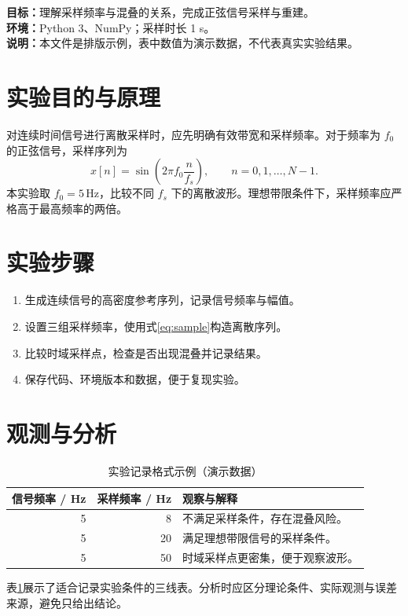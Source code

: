\documentclass[UTF8,fontset=fandol,a4paper,zihao=-4]{ctexart}
\begin{document}
\uestccover
\begin{summarybox}[实验概览]
\textbf{目标：}理解采样频率与混叠的关系，完成正弦信号采样与重建。\\
\textbf{环境：}Python 3、NumPy；采样时长 1 s。\\
\textbf{说明：}本文件是排版示例，表中数值为演示数据，不代表真实实验结果。
\end{summarybox}
\section{实验目的与原理}
对连续时间信号进行离散采样时，应先明确有效带宽和采样频率。对于频率为 $f_0$ 的正弦信号，采样序列为
\begin{equation}\label{eq:sample}
x[n]=\sin\left(2\pi f_0\frac{n}{f_s}\right),\qquad n=0,1,\ldots,N-1.
\end{equation}
本实验取 $f_0=5\,\mathrm{Hz}$，比较不同 $f_s$ 下的离散波形。理想带限条件下，采样频率应严格高于最高频率的两倍。
\section{实验步骤}
\begin{enumerate}
\item 生成连续信号的高密度参考序列，记录信号频率与幅值。
\item 设置三组采样频率，使用式\eqref{eq:sample}构造离散序列。
\item 比较时域采样点，检查是否出现混叠并记录结果。
\item 保存代码、环境版本和数据，便于复现实验。
\end{enumerate}
\section{观测与分析}
\begin{table}[htbp]\centering
\caption{实验记录格式示例（演示数据）}\label{tab:lab}
\begin{tabularx}{\linewidth}{@{}rrX@{}}\toprule
信号频率 / Hz & 采样频率 / Hz & 观察与解释\\\midrule
5 & 8 & 不满足采样条件，存在混叠风险。\\
5 & 20 & 满足理想带限信号的采样条件。\\
5 & 50 & 时域采样点更密集，便于观察波形。\\\bottomrule
\end{tabularx}
\end{table}
表\ref{tab:lab}展示了适合记录实验条件的三线表。分析时应区分理论条件、实际观测与误差来源，避免只给出结论。
\clearpage
\end{document}
